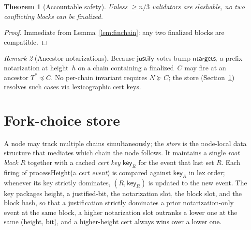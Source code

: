 \documentclass{article}
\newcommand{\just}{\ensuremath{\mathsf{justify}}\xspace}
\newcommand{\ntargets}{\mathsf{ntargets}}
\newcommand{\key}{\mathsf{key}}
\newcommand{\processHeight}{\textsf{processHeight}\xspace}
\theoremstyle{plain}
\newtheorem{theorem}{Theorem}
\theoremstyle{definition}
\theoremstyle{remark}
\newtheorem{remark}[theorem]{Remark}
\begin{document}
\begin{theorem}[Accountable safety]\label{thm:safety}
Unless $\geq n/3$ validators are slashable, no two conflicting blocks can be finalized.
\end{theorem}

\begin{proof}
Immediate from Lemma~\ref{lem:finchain}: any two finalized blocks are compatible.
\end{proof}

\begin{remark}[Ancestor notarizations]\label{rem:notarization-safety}
Because \just votes bump $\ntargets$, a prefix notarization at height~$h$ on a chain containing a finalized~$C$ may fire at an ancestor $T^* \preceq C$.
No per-chain invariant requires $N \succeq C$; the store (Section~\ref{sec:store}) resolves such cases via lexicographic cert keys.
\end{remark}

\section{Fork-choice store}\label{sec:store}

A node may track multiple chains simultaneously; the \emph{store} is the node-local data structure that mediates which chain the node follows.
It maintains a single \emph{root block} $R$ together with a cached \emph{cert key} $\key_R$ for the event that last set $R$.
Each firing of \processHeight (a \emph{cert event}) is compared against $\key_R$ in lex order; whenever its key strictly dominates, $(R, \key_R)$ is updated to the new event.
The key packages height, a justified-bit, the notarization slot, the block slot, and the block hash, so that a justification strictly dominates a prior notarization-only event at the same block, a higher notarization slot outranks a lower one at the same (height, bit), and a higher-height cert always wins over a lower one.
\end{document}
